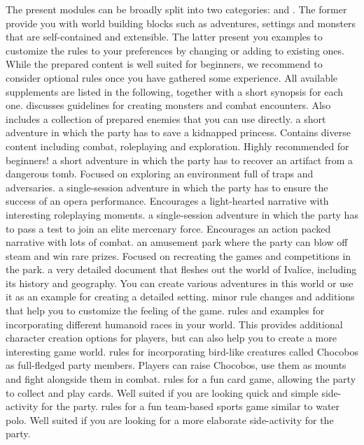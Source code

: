 The present modules can be broadly split into two categories:  and .
The former provide you with world building blocks such as adventures, settings and monsters that are self-contained and extensible.
The latter present you examples to customize the rules to your preferences by changing or adding to existing ones.
While the prepared content is well suited for beginners, we recommend to consider optional rules once you have gathered some experience.
All available supplements are listed in the following, together with a short synopsis for each one.
%
\newpage
%
{\large{}}
%
\vfill
%
 discusses guidelines for creating monsters and combat encounters.
Also includes a collection of prepared enemies that you can use directly.
%
\vfill
%
 a short adventure in which the party has to save a kidnapped princess. 
Contains diverse content including combat, roleplaying and exploration. Highly recommended for beginners!
%
\vfill
%
 a short adventure in which the party has to recover an artifact from a dangerous tomb.
Focused on exploring an environment full of traps and adversaries. 
%
\vfill
%
 a single-session adventure in which the party has to ensure the success of an opera performance.
Encourages a light-hearted narrative with interesting roleplaying moments.
%
\vfill
%
 a single-session adventure in which the party has to pass a test to join an elite mercenary force.
Encourages an action packed narrative with lots of combat.
%
\vfill
%
 an amusement park where the party can blow off steam and win rare prizes. 
Focused on recreating the games and competitions in the park.  
%
\vfill
%
 a very detailed document that fleshes out the world of Ivalice, including its history and geography.
You can create various adventures in this world or use it as an example for creating a detailed setting.
%
{\large\ofpar\ofrow{}}
%
\vfill
%
 minor rule changes and additions that help you to customize the feeling of the game.
%
\vfill
%
 rules and examples for incorporating different humanoid races in your world. 
This provides additional character creation options for players, but can also help you to create a more interesting game world.
%
\vfill
%
 rules for incorporating bird-like creatures called Chocobos as full-fledged party members.
Players can raise Chocobos, use them as mounts and fight alongside them in combat.
%
\vfill
%
 rules for a fun card game, allowing the party to collect and play cards.
Well suited if you are looking quick and simple side-activity for the party.
%
\vfill
%
 rules for a fun team-based sports game similar to water polo.
Well suited if you are looking for a more elaborate side-activity for the party.
%
\clearpage